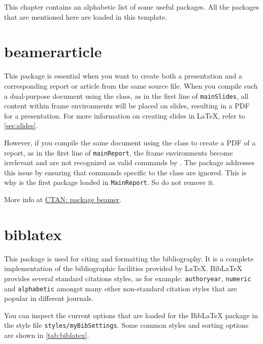 \label{ch:usefulpackages}
This chapter contains an alphabetic list of some useful packages. All the packages that are mentioned here are loaded in this template. 

\section{beamerarticle}\label{sec:beamerarticle}
This package is essential when you want to create both a presentation and a corresponding report or article from the same source file. When you compile such a dual-purpose document using the  class, as in the first line of \texttt{mainSlides}, all content within frame environments will be placed on slides, resulting in a PDF for a presentation. For more information on creating slides in \LaTeX, refer to \cref{sec:slides}.

However, if you compile the same document using the  class to create a PDF of a report, as in the first line of \texttt{mainReport}, the frame environments become irrelevant and are not recognized as valid commands by . The  package addresses this issue by ensuring that commands specific to the  class are ignored. This is why  is the first package loaded in \texttt{MainReport}. So do not remove it.

More info at \href{https://ctan.org/pkg/beamer?lang=EN}{CTAN: package beamer}.

\section{biblatex}\label{sec:biblatex}
This package is used for citing and formatting the bibliography. It is a complete implementation of the bibliographic facilities provided by \LaTeX. BibLaTeX provides several standard citations styles, as for example: \verb|authoryear|, \verb|numeric| and \verb|alphabetic| amongst many other non-standard citation styles that are popular in different journals.

You can inspect the current options that are loaded for the BibLaTeX package in the style file \verb|styles/myBibSettings|. Some common styles and sorting options are shown in \cref{tab:biblatex}. 

